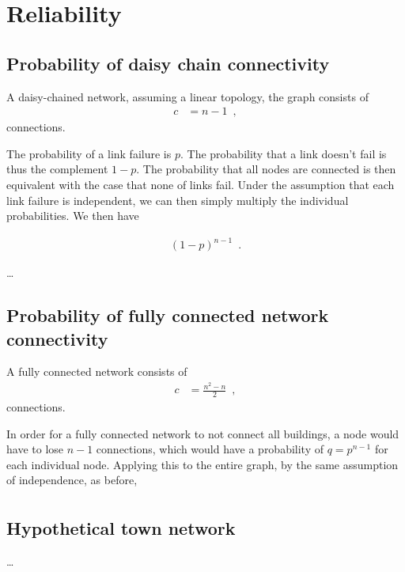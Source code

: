 
\section{Reliability}

\subsection{Probability of daisy chain connectivity}
A daisy-chained network, assuming a linear topology, the graph consists of
\begin{align}
    c &= n - 1 \enspace ,
\end{align}
connections.

The probability of a link failure is $p$. The probability that a link doesn't
fail is thus the complement $1 - p$. The probability that all nodes are connected
is then equivalent with the case that none of links fail. Under the assumption
that each link failure is independent, we can then simply multiply the individual
probabilities. We then have

\begin{align}
    (1 - p)^{n-1} \enspace .
\end{align}

\dots

\subsection{Probability of fully connected network connectivity}
A fully connected network consists of
\begin{align}
    c &= \frac{n^2 - n}{2} \enspace ,
\end{align}
connections.

In order for a fully connected network to not connect all buildings, a node
would have to lose $n-1$ connections, which would have a probability of
$q = p^{n-1}$ for each individual node. Applying this to the entire graph, by
the same assumption of independence, as before, 
\begin{align}
\end{align}

\subsection{Hypothetical town network}
\dots

